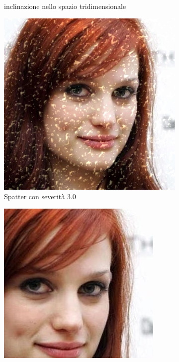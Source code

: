 \begin{figure}[ht]
\begin{subfigure}[t]{0.18\textwidth}
\caption{inclinazione nello spazio tridimensionale}
\label{sfig:corruption_skew}
\end{subfigure}\hfill
\begin{subfigure}[t]{0.18\textwidth}
\includegraphics[width=\textwidth]{./Images/spatter_severity_3.jpg}
\caption{Spatter con severità $3.0$}
\label{sfig:corruption_spatter}
\end{subfigure}\hfill
\begin{subfigure}[t]{0.18\textwidth}
\includegraphics[width=\textwidth]{./Images/random_crop_severity_0.3.jpg}

\end{subfigure}
\end{figure}
